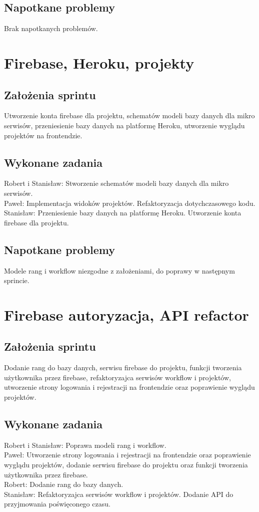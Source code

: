 \documentclass[a4paper,11pt]{report}
\begin{document}
\subsection {Napotkane problemy}
Brak napotkanych problemów.

\section {Firebase, Heroku, projekty}
\subsection {Założenia sprintu}
Utworzenie konta firebase dla projektu, schematów modeli bazy danych dla mikro serwisów, przeniesienie bazy danych na platformę Heroku, utworzenie wyglądu projektów na frontendzie.
\subsection {Wykonane zadania}
Robert i Stanisław: Stworzenie schematów modeli bazy danych dla mikro serwisów.\\
Paweł: Implementacja widoków projektów. Refaktoryzacja dotychczasowego kodu. \\
Stanisław: Przeniesienie bazy danych na platformę Heroku. Utworzenie konta firebase dla projektu.\\
\subsection {Napotkane problemy}
Modele rang i workflow niezgodne z założeniami, do poprawy w następnym sprincie.

\section {Firebase autoryzacja, API refactor}
\subsection {Założenia sprintu}
Dodanie rang do bazy danych, serwisu firebase do projektu, funkcji tworzenia użytkownika przez firebase, refaktoryzajca serwisów workflow i projektów, utworzenie strony logowania i rejestracji na frontendzie oraz poprawienie wyglądu projektów.
\subsection {Wykonane zadania}
Robert i Stanisław: Poprawa modeli rang i workflow.\\
Paweł: Utworzenie strony logowania i rejestracji na frontendzie oraz poprawienie wyglądu projektów, dodanie serwisu firebase do projektu oraz funkcji tworzenia użytkownika przez firebase.\\
Robert: Dodanie rang do bazy danych.\\
Stanisław: Refaktoryzajca serwisów workflow i projektów. Dodanie API do przyjmowania poświęconego czasu.\\
\end{document}
